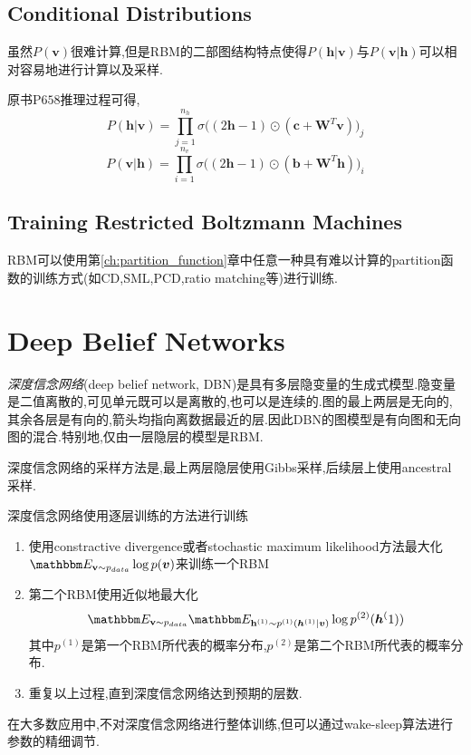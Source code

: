 \subsection{Conditional Distributions}

虽然$P(\bm v)$很难计算,但是RBM的二部图结构特点使得$P(\mathbf{h|v})$与$P(\mathbf{v|h})$可以相对容易地进行计算以及采样.

原书P$658$推理过程可得,
\begin{equation}
P(\bm{h|v})=\prod_{j=1}^{n_h}\sigma\Big((2\bm h-1)\odot(\bm c+\bm W^T\bm v)\Big)_j
\end{equation}
\begin{equation}
P(\bm{v|h})=\prod_{i=1}^{n_v}\sigma\Big((2\bm h-1)\odot(\bm b+\bm W^T\bm h)\Big)_i
\end{equation}

\subsection{Training Restricted Boltzmann Machines}

RBM可以使用第\ref{ch:partition_function}章中任意一种具有难以计算的partition函数的训练方式(如CD,SML,PCD,ratio matching等)进行训练.

\section{Deep Belief Networks}

\textit{深度信念网络}(deep belief network, DBN)是具有多层隐变量的生成式模型.隐变量是二值离散的,可见单元既可以是离散的,也可以是连续的.图的最上两层是无向的,其余各层是有向的,箭头均指向离数据最近的层.因此DBN的图模型是有向图和无向图的混合.特别地,仅由一层隐层的模型是RBM.

深度信念网络的采样方法是,最上两层隐层使用Gibbs采样,后续层上使用ancestral采样.

深度信念网络使用逐层训练的方法进行训练
\begin{enumerate}
    \item 使用constractive divergence或者stochastic maximum likelihood方法最大化$\mathbbm E_{\mathbf v\sim p_{data}}\log p(\bm v)$来训练一个RBM
    \item 第二个RBM使用近似地最大化
    \begin{equation}
    \mathbbm E_{\mathbf v\sim p_{data}}\mathbbm E_{\mathbf h^{(1)}\sim p^{(1)}(\bm h^{(1)}|\bm v)}\log p^{(2)}(\bm h^(1))
    \end{equation}
    其中$p^{(1)}$是第一个RBM所代表的概率分布,$p^{(2)}$是第二个RBM所代表的概率分布.
    \item 重复以上过程,直到深度信念网络达到预期的层数.
\end{enumerate}
在大多数应用中,不对深度信念网络进行整体训练,但可以通过wake-sleep算法进行参数的精细调节.

